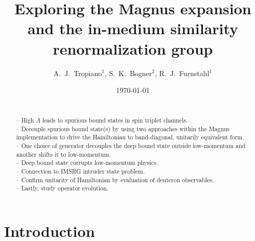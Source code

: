 \documentclass[preprintnumbers,floatfix,aps,prc,preprint,nofootinbib]{revtex4-1}
\begin{document}
\title{Exploring the Magnus expansion and the in-medium similarity renormalization group}


\author{A.~J.~Tropiano$^{1}$, S.~K.~Bogner$^{2}$, R.~J.~Furnstahl$^{1}$}


\date{\today}

\begin{abstract}

\\
-- High $\Lambda$ leads to spurious bound states in spin triplet channels.
\\
-- Decouple spurious bound state(s) by using two approaches within the Magnus implementation to drive the Hamiltonian to band-diagonal, unitarily equivalent form.
\\
-- One choice of generator decouples the deep bound state outside low-momentum and another shifts it to low-momentum.
\\
-- Deep bound state corrupts low-momentum physics.
\\
-- Connection to IMSRG intruder state problem.
\\
-- Confirm unitarity of Hamiltonian by evaluation of deuteron observables.
\\
-- Lastly, study operator evolution.

\end{abstract}

\maketitle

\newpage


\section{Introduction}
\label{sec:intro}
\end{document}
